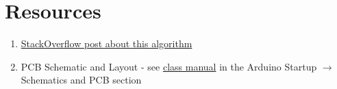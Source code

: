 \section{Resources}\label{sec:peakdetectionresources}
\begin{enumerate}
    \item \href{https://stackoverflow.com/a/22640362}{StackOverflow post about this algorithm}
    \item PCB Schematic and Layout - see 
            \href{https://github.com/semcneil/Fundamentals-of-Microcontrollers-Manual}{class manual} 
            in the Arduino Startup $\rightarrow$ Schematics and PCB section
\end{enumerate}

